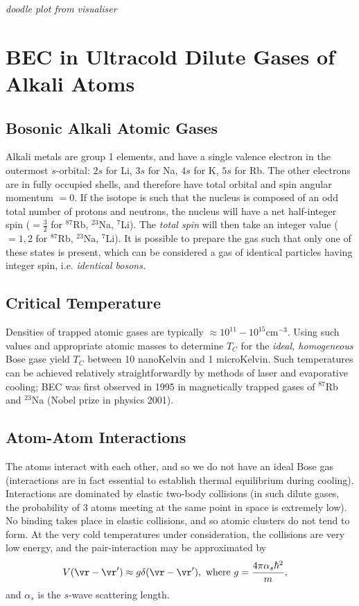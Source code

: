 \documentclass[qo.tex]{subfiles}
\begin{document}
\emph{doodle plot from visualiser}


\chapter{BEC in Ultracold Dilute Gases of Alkali Atoms}
\section{Bosonic Alkali Atomic Gases}
Alkali metals are group 1 elements, and have a single valence electron in the outermost $s$-orbital: $2s$ for Li, $3s$ for Na, $4s$ for K, $5s$ for Rb. 
The other electrons are in fully occupied shells, and therefore have total orbital and spin angular momentum $=0$.
If the isotope is such that the nucleus is composed of an odd total number of protons and neutrons, the nucleus will have a net half-integer spin ($=\frac32$ for $^{87}$Rb, $^{23}$Na, $^7$Li).
The \emph{total spin} will then take an integer value ($=1,2$ for $^{87}$Rb, $^{23}$Na, $^7$Li).
It is possible to prepare the gas such that only one of these states is present, which can be considered a gas of identical particles having integer spin, i.e. \emph{identical bosons.}

\section{Critical Temperature}
Densities of trapped atomic gases are typically $\approx10^{11}-10^{15}$cm$^{-3}$. 
Using such values and appropriate atomic masses to determine $T_C$ for the \emph{ideal, homogeneous} Bose gase yield $T_C$ between 10 nanoKelvin and 1 microKelvin.
Such temperatures can be achieved relatively straightforwardly by methods of laser and evaporative cooling; BEC was first observed in 1995 in magnetically trapped gases of $^{87}$Rb and $^{23}$Na (Nobel prize in physics 2001).

\section{Atom-Atom Interactions}
The atoms interact with each other, and so we do not have an ideal Bose gas (interactions are in fact essential to establish thermal equilibrium during cooling).
Interactions are dominated by elastic two-body collisions (in such dilute gases, the probability of 3 atoms meeting at the same point in space is extremely low).
No binding takes place in elastic collisions, and so atomic clusters do not tend to form. 
At the very cold temperatures under consideration, the collisions are very low energy, and the pair-interaction may be approximated by
\begin{align}
    V(\vr-\vr') &\approx g\delta(\vr-\vr'), \text{ where } g = \frac{4\pi\alpha_s\hbar^2}{m},
\end{align}
and $\alpha_s$ is the $s$-wave scattering length. 
\end{document}
